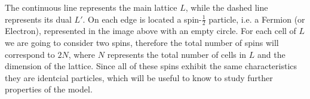 \documentclass[12pt]{report}
\begin{document}
\begin{minipage}{1\textwidth}
\begin{center}
		
	    \end{center}
	    
	    The continuous line represents the main lattice $L$, while the dashed line represents its dual $L'$.\newline 
		On each edge is located a spin-$\frac{1}{2}$ particle, i.e. a Fermion (or Electron), represented in the image above with an empty circle.
		For each cell of $L$ we are going to consider two spins, therefore the total number of spins will correspond to $2N$, where $N$ represents the total number of cells in $L$ and the dimension of the lattice. \newline
		Since all of these spins exhibit the same characteristics they are identcial particles, which will be useful to know to study further properties of the model.
	
	\end{minipage}
	
\end{document}
